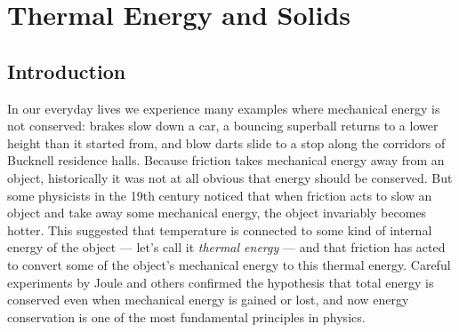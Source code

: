 \chapter{Thermal Energy and Solids}
\label{chapter:thermal_energy}

%
%
%
%
%
%

\section{Introduction}

In our everyday lives we experience many examples where mechanical
energy is not conserved: brakes slow down a car, a bouncing superball
returns to a lower height than it started from, and blow darts slide
to a stop along the corridors of Bucknell residence halls.  Because
friction takes mechanical energy away from an object, historically
it was not at all obvious that energy should be conserved.
But some physicists in the 19th century noticed that when friction
acts to slow an object and take away some mechanical energy, the
object invariably becomes hotter.  This suggested that temperature is
connected to some kind of internal energy of the object --- let's call
it {\it thermal energy} --- and that friction has acted to convert
some of the object's mechanical energy to this thermal energy.
Careful experiments by Joule and others confirmed the hypothesis that
total energy is conserved even when mechanical energy is gained or
lost, and now energy conservation is one of the most fundamental
principles in physics.

